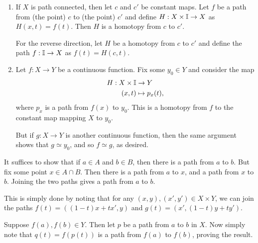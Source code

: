 \documentclass[../../solutions.tex]{subfiles}
\begin{document}
\begin{exercise} \leavevmode
\begin{enumerate}
\item If $X$ is path connected, then let $c$ and $c'$ be constant maps. Let $f$ be a path from (the point) $c$ to (the point) $c'$ and define $H:X\times\mathbb I\to X$ as $H(x,t)=f(t)$. Then $H$ is a homotopy from $c$ to $c'$. 

For the reverse direction, let $H$ be a homotopy from $c$ to $c'$ and define the path $f:\mathbb I\to X$ as $f(t)=H(c,t)$. 

\item Let $f:X\to Y$ be a continuous function. Fix some $y_0\in Y$ and consider the map \begin{align*}H:X\times\mathbb I&\to Y\\(x,t)&\mapsto p_x(t),\end{align*} where $p_x$ is a path from $f(x)$ to $y_0$. This is a homotopy from $f$ to the constant map mapping $X$ to $y_0$. 

But if $g:X\to Y$ is another continuous function, then the same argument shows that $g\simeq y_0$, and so $f\simeq g$, as desired. 
\end{enumerate} 
\end{exercise} 

\begin{exercise} \leavevmode
It suffices to show that if $a\in A$ and $b\in B$, then there is a path from $a$ to $b$. But fix some point $x\in A\cap B$. Then there is a path from $a$ to $x$, and a path from $x$ to $b$. Joining the two paths gives a path from $a$ to $b$. 
\end{exercise} 

\begin{exercise} \leavevmode
This is simply done by noting that for any $(x,y),(x',y')\in X\times Y$, we can join the paths $f(t)=((1-t)x+tx',y)$ and $g(t)=(x',(1-t)y+ty')$. 
\end{exercise} 

\begin{exercise} \leavevmode
Suppose $f(a),f(b)\in Y$. Then let $p$ be a path from $a$ to $b$ in $X$. Now simply note that $q(t)=f(p(t))$ is a path from $f(a)$ to $f(b)$, proving the result. 
\end{exercise} 
\end{document}
